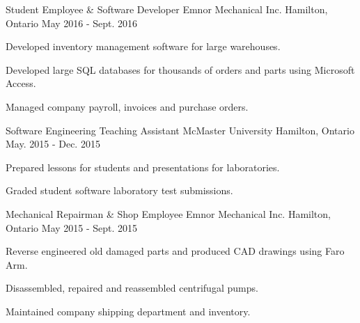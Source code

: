 \begin{cventries}
  \cventry
    {Student Employee \& Software Developer} %
    {Emnor Mechanical Inc.} %
    {Hamilton, Ontario} %
    {May 2016 - Sept. 2016} %
    {
      \begin{cvitems} %
        \item {Developed inventory management software for large warehouses.}
        \item {Developed large SQL databases for thousands of orders and parts using Microsoft Access.}
        \item {Managed company payroll, invoices and purchase orders.}
      \end{cvitems}
    }

  \cventry
    {Software Engineering Teaching Assistant} %
    {McMaster University} %
    {Hamilton, Ontario} %
    {May. 2015 - Dec. 2015} %
    {
      \begin{cvitems} %
        \item {Prepared lessons for students and presentations for laboratories.}
        \item {Graded student software laboratory test submissions.}
      \end{cvitems}
    }

  \cventry
    {Mechanical Repairman \& Shop Employee} %
    {Emnor Mechanical Inc.} %
    {Hamilton, Ontario} %
    {May 2015 - Sept. 2015} %
    {
      \begin{cvitems} %
        \item {Reverse engineered old damaged parts and produced CAD drawings using Faro Arm.}
        \item {Disassembled, repaired and reassembled centrifugal pumps.}
        \item {Maintained company shipping department and inventory.}
      \end{cvitems}
    }

\end{cventries}
